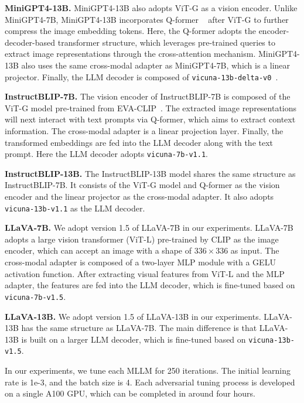 \textbf{MiniGPT4-13B.} MiniGPT4-13B also adopts ViT-G as a vision encoder. Unlike MiniGPT4-7B, MiniGPT4-13B incorporates Q-former ~\citep{li2023blip} after ViT-G to further compress the image embedding tokens. Here, the Q-former adopts the encoder-decoder-based transformer structure, which leverages pre-trained queries to extract image representations through the cross-attention mechanism. MiniGPT4-13B also uses the same cross-modal adapter as MiniGPT4-7B, which is a linear projector. Finally, the LLM decoder is composed of \texttt{vicuna-13b-delta-v0}~\citep{vicuna2023}.


\textbf{InstructBLIP-7B.} The vision encoder of InstructBLIP-7B is composed of the ViT-G model pre-trained from EVA-CLIP~\citep{fang2023eva}. The extracted image representations will next interact with text prompts via Q-former, which aims to extract context information. The cross-modal adapter is a linear projection layer. Finally, the transformed embeddings are fed into the LLM decoder along with the text prompt. Here the LLM decoder adopts \texttt{vicuna-7b-v1.1}.

\textbf{InstructBLIP-13B.} The InstructBLIP-13B model shares the same structure as InstructBLIP-7B. It consists of the ViT-G model and Q-former as the vision encoder and the linear projector as the cross-modal adapter. It also adopts \texttt{vicuna-13b-v1.1} as the LLM decoder.

\textbf{LLaVA-7B.} We adopt version 1.5 of LLaVA-7B in our experiments. LLaVA-7B adopts a large vision transformer (ViT-L) pre-trained by CLIP as the image encoder, which can accept an image with a shape of $336\times 336$ as input. The cross-modal adapter is composed of a two-layer MLP module with a GELU activation function. After extracting visual features from ViT-L and the MLP adapter, the features are fed into the LLM decoder, which is fine-tuned based on \texttt{vicuna-7b-v1.5}. 

\textbf{LLaVA-13B.} We adopt version 1.5 of LLaVA-13B in our experiments. LLaVA-13B has the same structure as LLaVA-7B. The main difference is that LLaVA-13B is built on a larger LLM decoder, which is fine-tuned based on \texttt{vicuna-13b-v1.5}. 


In our experiments, we tune each MLLM for 250 iterations. The initial learning rate is 1e-3, and the batch size is 4. Each adversarial tuning process is developed on a single A100 GPU, which can be completed in around four hours. 

